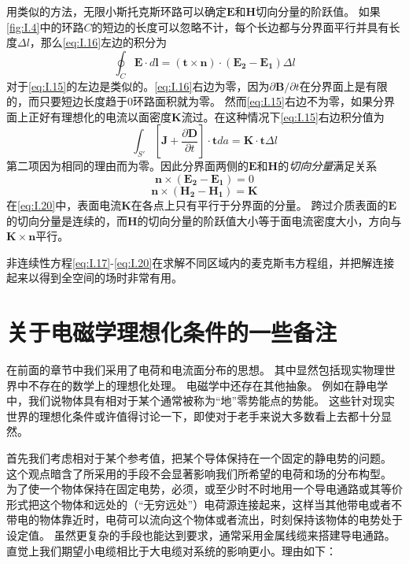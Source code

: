 \documentclass[12pt]{book}
\numberwithin{equation}{chapter}
\numberwithin{figure}{chapter}
\numberwithin{footnote}{page}
\begin{document}
用类似的方法，无限小斯托克斯环路可以确定$\mathbf{E}$和$\mathbf{H}$切向分量的阶跃值。
如果\autoref{fig:I.4}中的环路$C$的短边的长度可以忽略不计，每个长边都与分界面平行并具有长度$\Delta l$，那么\autoref{eq:I.16}左边的积分为
$$\oint_C \mathbf{E}\cdot d\mathbf{l}=(\mathbf{t}\times \mathbf{n})\cdot (\mathbf{E_2}-\mathbf{E_1})\Delta l$$
对于\autoref{eq:I.15}的左边是类似的。\autoref{eq:I.16}右边为零，因为$\partial\mathbf{B}/\partial t$在分界面上是有限的，而只要短边长度趋于0环路面积就为零。
然而\autoref{eq:I.15}右边不为零，如果分界面上正好有理想化的电流以面密度$\mathbf{K}$流过。在这种情况下\autoref{eq:I.15}右边积分值为
$$\int_{S'}[\mathbf{J}+\frac{\partial\mathbf{D}}{\partial t}]\cdot \mathbf{t} da=\mathbf{K}\cdot \mathbf{t} \Delta l$$
第二项因为相同的理由而为零。因此分界面两侧的$\mathbf{E}$和$\mathbf{H}$的\textit{切向分量}满足关系
\begin{equation}\label{eq:I.19}
    \mathbf{n}\times (\mathbf{E_2}-\mathbf{E_1})=0
\end{equation}
\begin{equation}\label{eq:I.20}
    \mathbf{n}\times (\mathbf{H_2}-\mathbf{H_1})=\mathbf{K}
\end{equation}
在\autoref{eq:I.20}中，表面电流$\mathbf{K}$在各点上只有平行于分界面的分量。
跨过介质表面的$\mathbf{E}$的切向分量是连续的，而$\mathbf{H}$的切向分量的阶跃值大小等于面电流密度大小，方向与$\mathbf{K}\times \mathbf{n}$平行。

非连续性方程\autoref{eq:I.17}-\autoref{eq:I.20}在求解不同区域内的麦克斯韦方程组，并把解连接起来以得到全空间的场时非常有用。

\section{关于电磁学理想化条件的一些备注}\label{sec:I.6}

在前面的章节中我们采用了电荷和电流面分布的思想。
其中显然包括现实物理世界中不存在的数学上的理想化处理。
电磁学中还存在其他抽象。
例如在静电学中，我们说物体具有相对于某个通常被称为“地”零势能点的势能。
这些针对现实世界的理想化条件或许值得讨论一下，即使对于老手来说大多数看上去都十分显然。

首先我们考虑相对于某个参考值，把某个导体保持在一个固定的静电势的问题。
这个观点暗含了所采用的手段不会显著影响我们所希望的电荷和场的分布构型。
为了使一个物体保持在固定电势，必须，或至少时不时地用一个导电通路或其等价形式把这个物体和远处的（“无穷远处”）电荷源连接起来，这样当其他带电或者不带电的物体靠近时，电荷可以流向这个物体或者流出，时刻保持该物体的电势处于设定值。
虽然更复杂的手段也能达到要求，通常采用金属线缆来搭建导电通路。
直觉上我们期望小电缆相比于大电缆对系统的影响更小。理由如下：
\end{document}
